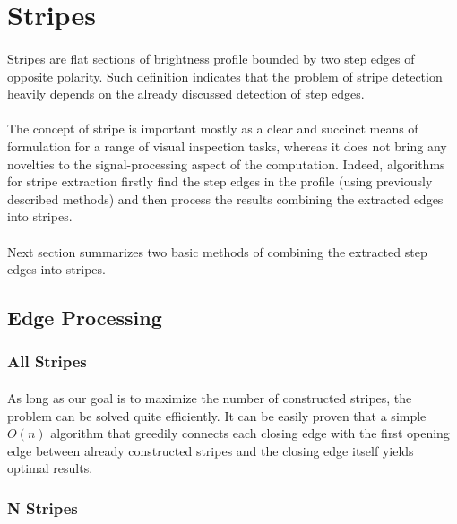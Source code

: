 \section{Stripes}

\paragraph*{}
Stripes are flat sections of brightness profile bounded by two step edges of opposite polarity. Such definition indicates that the problem of stripe detection heavily depends on the already discussed detection of step edges. 

\paragraph*{}
The concept of stripe is important mostly as a clear and succinct means of formulation for a range of visual inspection tasks, whereas it does not bring any novelties to the signal-processing aspect of the computation. Indeed, algorithms for stripe extraction firstly find the step edges in the profile (using previously described methods) and then process the results combining the extracted edges into stripes. 

\paragraph*{}
Next section summarizes two basic methods of combining the extracted step edges into stripes.

\subsection{Edge Processing}

\subsubsection{All Stripes}

\paragraph*{} As long as our goal is to maximize the number of constructed stripes, the problem can be solved quite efficiently. It can be easily proven that a simple $O(n)$ algorithm that greedily connects each closing edge with the first opening edge between already constructed stripes and the closing edge itself yields optimal results.

\subsubsection{N Stripes}

